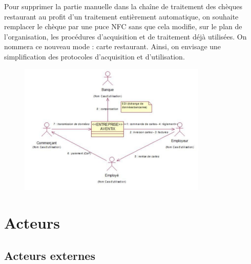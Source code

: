 Pour supprimer la partie manuelle dans la chaîne de traitement des chèques
restaurant au profit d'un traitement entièrement automatique, on souhaite
remplacer le chèque par une puce NFC sans que cela modifie, sur le plan de
l'organisation, les procédures d'acquisition et de traitement déjà utilisées.
On nommera ce nouveau mode : carte restaurant. Ainsi, on envisage une
simplification des protocoles d'acquisition et d'utilisation.

\begin{figure}[h!]
    \centering
    \includegraphics[width=0.8\textwidth]{cdu2}
    \label{fig:cdu2}
\end{figure}

\section{Acteurs}

\subsection{Acteurs externes}

